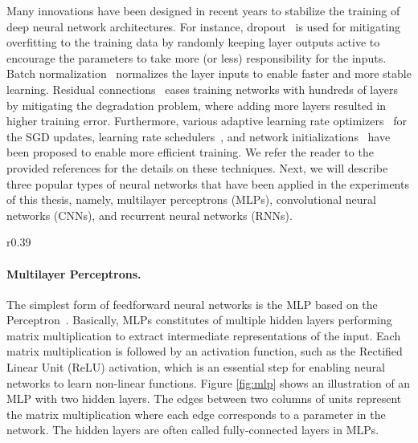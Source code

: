 Many innovations have been designed in recent years to stabilize the training of deep neural network architectures. For instance, dropout~\cite{srivastava2014dropout} is used for mitigating overfitting to the training data by randomly keeping layer outputs active to encourage the parameters to take more (or less) responsibility for the inputs. Batch normalization~\cite{ioffe2015batch, santurkar2018does} normalizes the layer inputs to enable faster and more stable learning. Residual connections~\cite{he2016deep} eases training networks with hundreds of layers by mitigating the degradation problem, where adding more layers resulted in higher training error. Furthermore, various adaptive learning rate optimizers~\cite{kingma2014adam,liu2019variance,tieleman2012lecture} for the SGD updates, learning rate schedulers~\cite{smith2017cyclical}, and network initializations~\cite{glorot2010understanding, he2015delving} have been proposed to enable more efficient training. We refer the reader to the provided references for the details on these techniques.
Next, we will describe three popular types of neural networks that have been applied in the experiments of this thesis, namely, multilayer perceptrons (MLPs), convolutional neural networks (CNNs), and recurrent neural networks (RNNs).

\vspace{-3mm}
\begin{wrapfigure}{r}{0.39\textwidth}
	\centering
	\vspace{-3mm}
	\resizebox{0.39\textwidth}{!}{
		
	}
	\captionsetup{width=.9\linewidth}
	\caption{Illustration of MLP with two hidden layers.}
	\vspace{-3mm}
	\label{fig:mlp}
\end{wrapfigure}
\paragraph{Multilayer Perceptrons.} The simplest form of feedforward neural networks is the MLP based on the Perceptron~\cite{rosenblatt1958perceptron}. Basically, MLPs constitutes of multiple hidden layers performing matrix multiplication to extract intermediate representations of the input. Each matrix multiplication is followed by an activation function, such as the Rectified Linear Unit (ReLU) activation, which is an essential step for enabling neural networks to learn non-linear functions. Figure \ref{fig:mlp} shows an illustration of an MLP with two hidden layers. The edges between two columns of units represent the matrix multiplication where each edge corresponds to a parameter in the network. The hidden layers are often called fully-connected layers in MLPs. 

